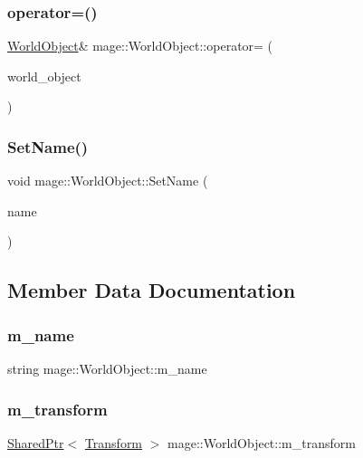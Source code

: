 \subsubsection{\texorpdfstring{operator=()}{operator=()}}
{\footnotesize\ttfamily \hyperlink{classmage_1_1_world_object}{World\+Object}\& mage\+::\+World\+Object\+::operator= (\begin{DoxyParamCaption}\item[{const \hyperlink{classmage_1_1_world_object}{World\+Object} \&}]{world\+\_\+object }\end{DoxyParamCaption})}

\hypertarget{classmage_1_1_world_object_aee42f65080a69ed5cfc681382328fe31}{}\label{classmage_1_1_world_object_aee42f65080a69ed5cfc681382328fe31} 
\subsubsection{\texorpdfstring{Set\+Name()}{SetName()}}
{\footnotesize\ttfamily void mage\+::\+World\+Object\+::\+Set\+Name (\begin{DoxyParamCaption}\item[{const string \&}]{name }\end{DoxyParamCaption})}



\subsection{Member Data Documentation}
\hypertarget{classmage_1_1_world_object_a383cc5e1275f389459021a16b958049c}{}\label{classmage_1_1_world_object_a383cc5e1275f389459021a16b958049c} 
\subsubsection{\texorpdfstring{m\+\_\+name}{m\_name}}
{\footnotesize\ttfamily string mage\+::\+World\+Object\+::m\+\_\+name\hspace{0.3cm}{\ttfamily [private]}}

\hypertarget{classmage_1_1_world_object_a599102e219249b46e1cf60c98efd559c}{}\label{classmage_1_1_world_object_a599102e219249b46e1cf60c98efd559c} 
\subsubsection{\texorpdfstring{m\+\_\+transform}{m\_transform}}
{\footnotesize\ttfamily \hyperlink{namespacemage_a1e01ae66713838a7a67d30e44c67703e}{Shared\+Ptr}$<$ \hyperlink{structmage_1_1_transform}{Transform} $>$ mage\+::\+World\+Object\+::m\+\_\+transform\hspace{0.3cm}{\ttfamily [private]}}

